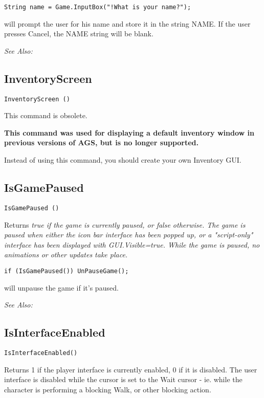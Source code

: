 \begin{verbatim}
String name = Game.InputBox("!What is your name?");
\end{verbatim}
will prompt the user for his name and store it in the string NAME. If the user presses Cancel,
the NAME string will be blank.

\it{See Also:} 


\subsection{InventoryScreen}\label{InventoryScreen}%

\begin{verbatim}
InventoryScreen ()
\end{verbatim}

This command is obsolete.

\bf{This command was used for displaying a default inventory window
in previous versions of AGS, but is no longer supported.}

Instead of using this command, you should create your own Inventory GUI.


\subsection{IsGamePaused}\label{IsGamePaused}%

\begin{verbatim}
IsGamePaused ()
\end{verbatim}
Returns \it{true} if the game is currently paused, or \it{false} otherwise.
The game is paused when either the icon bar interface has been popped up,
or a "script-only" interface has been displayed with GUI.Visible=true. While
the game is paused, no animations or other updates take place.

\begin{verbatim}
if (IsGamePaused()) UnPauseGame();
\end{verbatim}
will unpause the game if it's paused.

\it{See Also:} 


\subsection{IsInterfaceEnabled}\label{IsInterfaceEnabled}%

\begin{verbatim}
IsInterfaceEnabled()
\end{verbatim}
Returns 1 if the player interface is currently enabled, 0 if it is disabled.
The user interface is disabled while the cursor is set to the Wait cursor -
ie. while the character is performing a blocking Walk, or other blocking
action.

